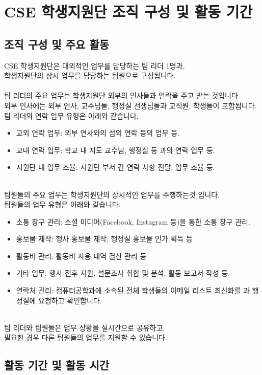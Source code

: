 \newpage
\section{CSE 학생지원단 조직 구성 및 활동 기간}
\subsection{조직 구성 및 주요 활동}
CSE 학생지원단은 대외적인 업무를 담당하는 팀 리더 1명과,\\
학생지원단의 상시 업무를 담당하는 팀원으로 구성됩니다.\\
\\
팀 리더의 주요 업무는 학생지원단 외부의 인사들과 연락을 주고 받는 것입니다.\\
외부 인사에는 외부 연사, 교수님들, 행정실 선생님들과 교직원, 학생들이 포함됩니다.\\
팀 리더의 연락 업무 유형은 아래와 같습니다.
\begin{itemize}
    \item 교외 연락 업무: 외부 연사와의 섭외 연락 등의 업무 등.
    \item 교내 연락 업무: 학교 내 지도 교수님, 행정실 등 과의 연락 업무 등.
    \item 지원단 내 업무 조율: 지원단 부서 간 연락 사항 전달, 업무 조율 등.
\end{itemize}
\text{  }\\
팀원들의 주요 업무는 학생지원단의 상시적인 업무를 수행하는것 입니다.\\
팀원들의 업무 유형은 아래와 같습니다.
\begin{itemize}
    \item 소통 창구 관리: 소셜 미디어(Facebook, Instagram 등)을 통한 소통 창구 관리.
    \item 홍보물 제작: 행사 홍보물 제작, 행정실 홍보물 인가 획득 등
    \item 활동비 관리: 활동비 사용 내역 결산 관리 등
    \item 기타 업무: 행사 전후 지원, 설문조사 취합 및 분석, 활동 보고서 작성 등.
    \item 연락처 관리: 컴퓨터공학과에 소속된 전체 학생들의 이메일 리스트 최신화를 과 행정실에 요청하고 확인합니다.
\end{itemize}
\text{  }\\
팀 리더와 팀원들은 업무 상황을 실시간으로 공유하고,\\
필요한 경우 다른 팀원들의 업무를 지원할 수 있습니다.
\subsection{활동 기간 및 활동 시간}
